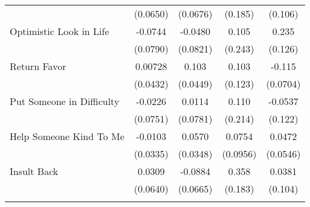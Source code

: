 {\begin{tabular}{l*{4}{c}}
            &    (0.0650)         &    (0.0676)         &     (0.185)         &     (0.106)         \\
[1em]
Optimistic Look in Life&     -0.0744         &     -0.0480         &       0.105         &       0.235         \\
            &    (0.0790)         &    (0.0821)         &     (0.243)         &     (0.126)         \\
[1em]
Return Favor&     0.00728         &       0.103\sym{*}  &       0.103         &      -0.115         \\
            &    (0.0432)         &    (0.0449)         &     (0.123)         &    (0.0704)         \\
[1em]
Put Someone in Difficulty&     -0.0226         &      0.0114         &       0.110         &     -0.0537         \\
            &    (0.0751)         &    (0.0781)         &     (0.214)         &     (0.122)         \\
[1em]
Help Someone Kind To Me&     -0.0103         &      0.0570         &      0.0754         &      0.0472         \\
            &    (0.0335)         &    (0.0348)         &    (0.0956)         &    (0.0546)         \\
[1em]
Insult Back &      0.0309         &     -0.0884         &       0.358\sym{*}  &      0.0381         \\
            &    (0.0640)         &    (0.0665)         &     (0.183)         &     (0.104)         \\
\hline\hline
{}\\
\end{tabular}
}
